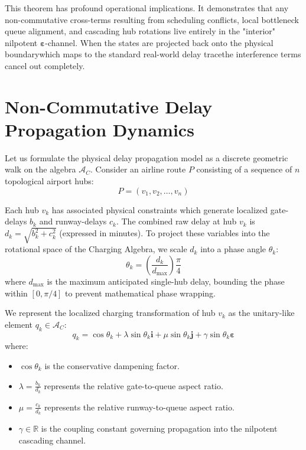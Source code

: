 \documentclass[11pt,a4paper]{book}
\begin{document}
This theorem has profound operational implications. It demonstrates that any non-commutative cross-terms resulting from scheduling conflicts, local bottleneck queue alignment, and cascading hub rotations live entirely in the "interior" nilpotent $\boldsymbol{\varepsilon}$-channel. When the states are projected back onto the physical boundarywhich maps to the standard real-world delay tracethe interference terms cancel out completely.

\section{Non-Commutative Delay Propagation Dynamics}
\label{sec:delay_dynamics}

Let us formulate the physical delay propagation model as a discrete geometric walk on the algebra $\mathcal{A}_C$. Consider an airline route $P$ consisting of a sequence of $n$ topological airport hubs:
\begin{equation}
P = (v_1, v_2, \dots, v_n)
\end{equation}

Each hub $v_k$ has associated physical constraints which generate localized gate-delays $b_k$ and runway-delays $c_k$. The combined raw delay at hub $v_k$ is $d_k = \sqrt{b_k^2 + c_k^2}$ (expressed in minutes). To project these variables into the rotational space of the Charging Algebra, we scale $d_k$ into a phase angle $\theta_k$:
\begin{equation}
\theta_k = \left(\frac{d_k}{d_{\max}}\right) \frac{\pi}{4}
\end{equation}
where $d_{\max}$ is the maximum anticipated single-hub delay, bounding the phase within $[0, \pi/4]$ to prevent mathematical phase wrapping.

We represent the localized charging transformation of hub $v_k$ as the unitary-like element $q_k \in \mathcal{A}_C$:
\begin{equation}
q_k = \cos \theta_k + \lambda \sin \theta_k \mathbf{i} + \mu \sin \theta_k \mathbf{j} + \gamma \sin \theta_k \boldsymbol{\varepsilon}
\end{equation}
where:
\begin{itemize}
    \item $\cos \theta_k$ is the conservative dampening factor.
    \item $\lambda = \frac{b_k}{d_k}$ represents the relative gate-to-queue aspect ratio.
    \item $\mu = \frac{c_k}{d_k}$ represents the relative runway-to-queue aspect ratio.
    \item $\gamma \in \mathbb{R}$ is the coupling constant governing propagation into the nilpotent cascading channel.
\end{itemize}
\end{document}
